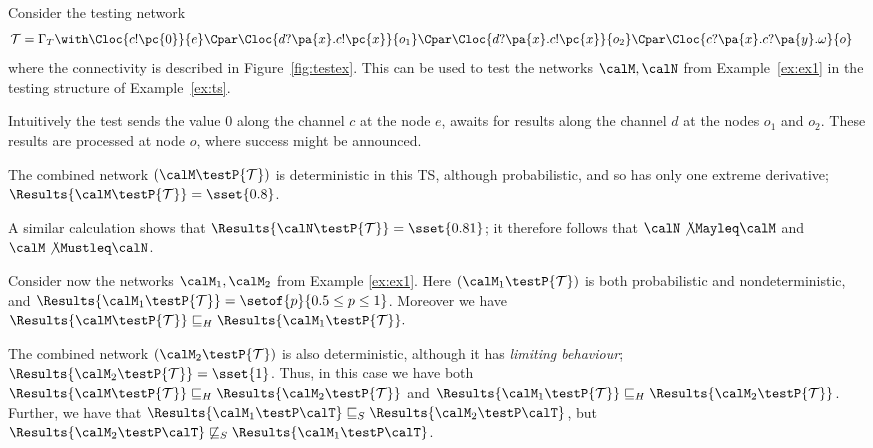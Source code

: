 \documentclass{LMCS}
\begin{document}
\begin{exa}\label{ex:testing} 
  Consider the testing network 
\begin{align*}
  &{\mathcal T} = \Gamma_T \with \Cloc{c!\pc{0}}{e} \Cpar \Cloc{d?\pa{x}.c!\pc{x}}{o_1} 
                       \Cpar \Cloc{d?\pa{x}.c!\pc{x}}{o_2} 
                       \Cpar \Cloc{c?\pa{x}.c?\pa{y}.\omega}{o} 
\end{align*}
where the connectivity is described in Figure~\ref{fig:testex}. This can be used to test the networks 
$\calM, \calN$ from Example~\ref{ex:ex1} in the testing structure of Example~\ref{ex:ts}. 
 
Intuitively the test sends the value $0$ along the channel $c$ at the node $e$, awaits for results along the channel
$d$ at the nodes $o_1$ and $o_2$. These results are processed at node $o$, where success might be announced. 

The combined network
$(\calM \testP {\mathcal T})$ is deterministic in this TS, although probabilistic, and so has only one extreme
derivative; $\Results{ \calM \testP {\mathcal T}} = \sset{0.8}$.


A similar calculation shows that  $\Results{ \calN \testP {\mathcal T}} = \sset{0.81}$;  it 
therefore follows that $\calN \not \Mayleq \calM$ and $\calM \not\Mustleq \calN$. 

Consider now the networks $\calM_1, \calM_2$ from Example \ref{ex:ex1}. 
Here $(\calM_1 \testP {\mathcal T})$ is both probabilistic and nondeterministic, and
 $\Results{ \calM_1 \testP {\mathcal T}} = \setof{p}{ 0.5 \leq p \leq 1}$. Moreover 
 we have 
\begin{math}
   \Results{ \calM \testP {\mathcal T}} \sqsubseteq_{H}  \Results{\calM_1 \testP {\mathcal T}}. 
\end{math}

The combined network $(\calM_2 \testP {\mathcal T})$ is also deterministic, although it has 
\emph{limiting behaviour}; $\Results{ \calM_2 \testP {\mathcal T}} = \sset{1}$. Thus, in this case we 
have both $\Results{ \calM \testP {\mathcal T}} \sqsubseteq_{H} \Results{ \calM_2 \testP {\mathcal T}}$ and 
$\Results{ \calM_1 \testP {\mathcal T}} \sqsubseteq_{H} \Results{ \calM_2 \testP {\mathcal T}}$. 
Further, we have that 
$\Results{\calM_1 \testP \calT} \sqsubseteq_{S} \Results{\calM_2 \testP \calT}$, but 
$\Results{\calM_2 \testP \calT} \not\sqsubseteq_{S} \Results{\calM_1 \testP \calT}$.
 \end{exa}
\end{document}
